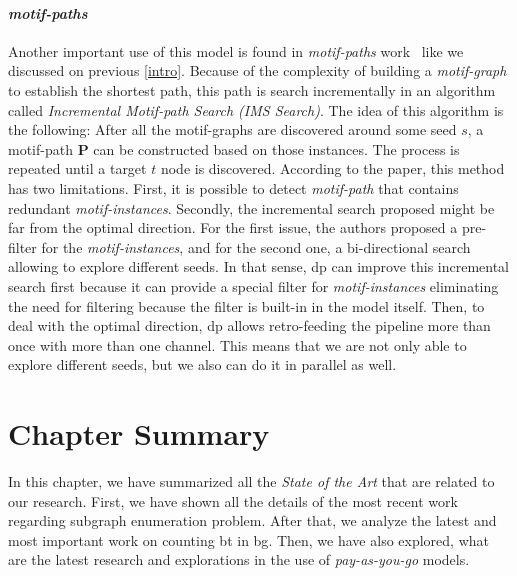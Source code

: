 \paragraph{\emph{motif-paths}} Another important use of this model is found in \emph{motif-paths} work~\cite{Li2019MotifPA} like we discussed on previous \autoref{intro}.
Because of the complexity of building a \emph{motif-graph} to establish the shortest path, this path is search incrementally in an algorithm called \emph{Incremental Motif-path Search (IMS Search)}.
The idea of this algorithm is the following: After all the motif-graphs are discovered around some seed $s$, a motif-path $\mathbf{P}$ can be constructed based on those instances.
The process is repeated until a target $t$ node is discovered. According to the paper, this method has two limitations. First, it is possible to detect \emph{motif-path} that contains 
redundant \emph{motif-instances}. Secondly, the incremental search proposed might be far from the optimal direction. For the first issue, the authors proposed a pre-filter for the \emph{motif-instances},
and for the second one, a bi-directional search allowing to explore different seeds. 
In that sense, \acrshort{dp} can improve this incremental search first because it can provide a special filter for \emph{motif-instances} eliminating the need for filtering because the filter is built-in in the model itself.
Then, to deal with the optimal direction, \acrshort{dp} allows retro-feeding the pipeline more than once with more than one channel. This means that we are not only able to explore different seeds, but we also can do it in parallel as well.

\section{Chapter Summary}
In this chapter, we have summarized all the \emph{State of the Art} that are related to our research.
First, we have shown all the details of the most recent work regarding subgraph enumeration problem. 
After that, we analyze the latest and most important work on counting \acrlong{bt} in \acrlong{bg}.
Then, we have also explored, what are the latest research and explorations in the use of \emph{pay-as-you-go} models.
